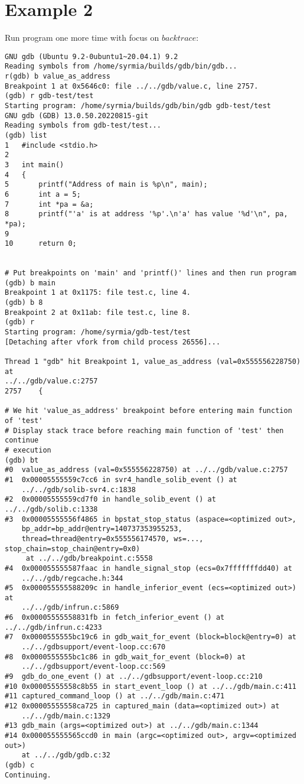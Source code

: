 \documentclass{report}
\begin{document}
\section *{Example 2}
Run program one more time with focus on $backtrace$:
\begin{verbatim}
GNU gdb (Ubuntu 9.2-0ubuntu1~20.04.1) 9.2
Reading symbols from /home/syrmia/builds/gdb/bin/gdb...
r(gdb) b value_as_address
Breakpoint 1 at 0x5646c0: file ../../gdb/value.c, line 2757.
(gdb) r gdb-test/test
Starting program: /home/syrmia/builds/gdb/bin/gdb gdb-test/test
GNU gdb (GDB) 13.0.50.20220815-git
Reading symbols from gdb-test/test...
(gdb) list
1	#include <stdio.h>
2	
3	int main()
4	{
5		printf("Address of main is %p\n", main);
6		int a = 5;
7		int *pa = &a;
8		printf("'a' is at address '%p'.\n'a' has value '%d'\n", pa, *pa);
9	
10		return 0;


# Put breakpoints on 'main' and 'printf()' lines and then run program
(gdb) b main
Breakpoint 1 at 0x1175: file test.c, line 4.
(gdb) b 8
Breakpoint 2 at 0x11ab: file test.c, line 8.
(gdb) r
Starting program: /home/syrmia/gdb-test/test 
[Detaching after vfork from child process 26556]...

Thread 1 "gdb" hit Breakpoint 1, value_as_address (val=0x555556228750) at 
../../gdb/value.c:2757
2757	{

# We hit 'value_as_address' breakpoint before entering main function of 'test'
# Display stack trace before reaching main function of 'test' then continue 
# execution
(gdb) bt
#0  value_as_address (val=0x555556228750) at ../../gdb/value.c:2757
#1  0x00005555559c7cc6 in svr4_handle_solib_event () at 
    ../../gdb/solib-svr4.c:1838
#2  0x00005555559cd7f0 in handle_solib_event () at ../../gdb/solib.c:1338
#3  0x00005555556f4865 in bpstat_stop_status (aspace=<optimized out>, 
    bp_addr=bp_addr@entry=140737353955253, 
    thread=thread@entry=0x555556174570, ws=..., stop_chain=stop_chain@entry=0x0)
     at ../../gdb/breakpoint.c:5558
#4  0x000055555587faac in handle_signal_stop (ecs=0x7fffffffdd40) at 
    ../../gdb/regcache.h:344
#5  0x000055555588209c in handle_inferior_event (ecs=<optimized out>) at 
    ../../gdb/infrun.c:5869
#6  0x00005555558831fb in fetch_inferior_event () at ../../gdb/infrun.c:4233
#7  0x0000555555bc19c6 in gdb_wait_for_event (block=block@entry=0) at 
    ../../gdbsupport/event-loop.cc:670
#8  0x0000555555bc1c86 in gdb_wait_for_event (block=0) at 
    ../../gdbsupport/event-loop.cc:569
#9  gdb_do_one_event () at ../../gdbsupport/event-loop.cc:210
#10 0x00005555558c8b55 in start_event_loop () at ../../gdb/main.c:411
#11 captured_command_loop () at ../../gdb/main.c:471
#12 0x00005555558ca725 in captured_main (data=<optimized out>) at 
    ../../gdb/main.c:1329
#13 gdb_main (args=<optimized out>) at ../../gdb/main.c:1344
#14 0x000055555565ccd0 in main (argc=<optimized out>, argv=<optimized out>) 
    at ../../gdb/gdb.c:32
(gdb) c
Continuing.


\end{verbatim}
\end{document}

